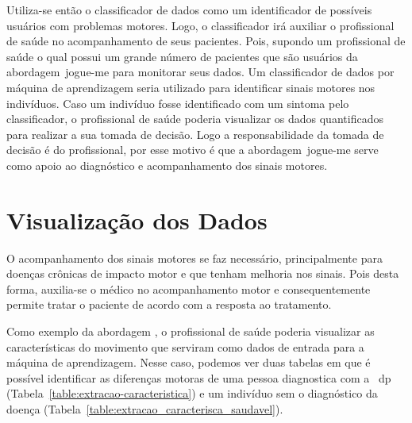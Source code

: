 Utiliza-se então o classificador de dados como um identificador de possíveis usuários com problemas motores. Logo, o classificador irá auxiliar o profissional de saúde no acompanhamento de seus pacientes. Pois, supondo um profissional de saúde o qual possui um grande número de pacientes que são usuários da abordagem~\ac{jogue-me} para monitorar seus dados. Um classificador de dados por máquina de aprendizagem seria utilizado para identificar sinais motores nos indivíduos. Caso um indivíduo fosse identificado com um sintoma pelo classificador, o profissional de saúde poderia visualizar os dados quantificados para realizar a sua tomada de decisão. Logo a responsabilidade da tomada de decisão é do profissional, por esse motivo é que a abordagem~\ac{jogue-me} serve como apoio ao diagnóstico e acompanhamento dos sinais motores.




\section{Visualização dos Dados}
O acompanhamento dos sinais motores se faz necessário, principalmente para doenças crônicas de impacto motor e que tenham melhoria nos sinais. Pois desta forma, auxilia-se o médico no acompanhamento motor e consequentemente permite tratar o paciente de acordo com a resposta ao tratamento.

Como exemplo da abordagem , o profissional de saúde poderia visualizar as características do movimento que serviram como dados de entrada para a máquina de aprendizagem. Nesse caso, podemos ver duas tabelas em que é possível identificar as diferenças motoras de uma pessoa diagnostica com a ~\ac{dp} (Tabela~\ref{table:extracao-caracteristica}) e um indivíduo sem o diagnóstico da doença (Tabela~\ref{table:extracao_caracterisca_saudavel}).

